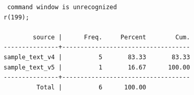 \documentclass[
  12pt,
]{article}
\newenvironment{Shaded}{\begin{snugshade}}{\end{snugshade}}
\newcommand{\KeywordTok}[1]{\textcolor[rgb]{0.13,0.29,0.53}{\textbf{#1}}}
\newcommand{\NormalTok}[1]{#1}
\begin{document}
\begin{verbatim}
 command window is unrecognized
r(199);

        source |      Freq.     Percent        Cum.
---------------+-----------------------------------
sample_text_v4 |          5       83.33       83.33
sample_text_v5 |          1       16.67      100.00
---------------+-----------------------------------
         Total |          6      100.00
\end{verbatim}

\begin{Shaded}
\end{Shaded}
\end{document}
